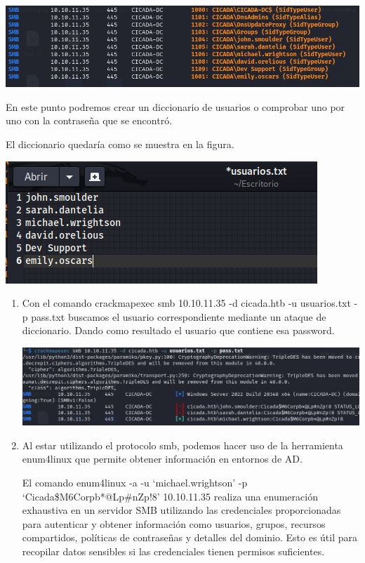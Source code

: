 \documentclass[
  letterpaper,
  DIV=11,
  numbers=noendperiod]{scrreprt}
\begin{document}
\includegraphics{Unidades/unidad10/imagenes/9.png}

En este punto podremos crear un diccionario de usuarios o comprobar uno
por uno con la contraseña que se encontró.

El diccionario quedaría como se muestra en la figura.

\includegraphics{Unidades/unidad10/imagenes/10.png}

\begin{enumerate}
\def\labelenumi{\arabic{enumi})}
\setcounter{enumi}{6}
\item
  Con el comando crackmapexec smb 10.10.11.35 -d cicada.htb -u
  usuarios.txt -p pass.txt buscamos el usuario correspondiente mediante
  un ataque de diccionario. Dando como resultado el usuario que contiene
  esa password.

  \includegraphics{Unidades/unidad10/imagenes/11.png}
\item
  Al estar utilizando el protocolo smb, podemos hacer uso de la
  herramienta enum4linux que permite obtener información en entornos de
  AD.

  El comando enum4linux -a -u `michael.wrightson' -p
  `Cicada\$M6Corpb*@Lp\#nZp!8' 10.10.11.35 realiza una enumeración
  exhaustiva en un servidor SMB utilizando las credenciales
  proporcionadas para autenticar y obtener información como usuarios,
  grupos, recursos compartidos, políticas de contraseñas y detalles del
  dominio. Esto es útil para recopilar datos sensibles si las
  credenciales tienen permisos suficientes.
\end{enumerate}
\end{document}
